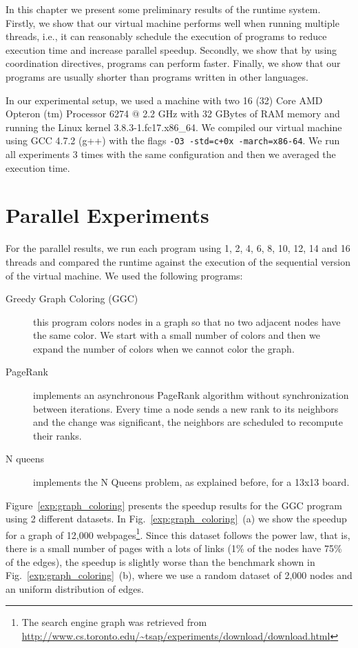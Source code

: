In this chapter we present some preliminary results of the \lang runtime system.
Firstly, we show that our virtual machine performs well when running multiple threads,
i.e., it can reasonably schedule the execution of programs to reduce execution time and increase parallel speedup. Secondly, we show that by using coordination directives, programs can perform faster.
Finally, we show that our programs are usually shorter than programs written in other languages.  

In our experimental setup, we used a machine 
with two 16 (32) Core AMD Opteron
(tm) Processor 6274 $@$ 2.2 GHz with 32 GBytes of RAM memory and running the Linux
kernel 3.8.3-1.fc17.x86\_64.
     We compiled our virtual machine using GCC 4.7.2 (g++) with the flags \texttt{-O3 -std=c+0x -march=x86-64}.
     We run all experiments 3 times with the same configuration and then we averaged the execution time.

\section{Parallel Experiments}

For the parallel results, we run each program using 1, 2, 4, 6, 8, 10, 12, 14 and 16 threads and compared the runtime against the execution of the sequential version of the virtual machine. We used the following programs:

\newcommand{\figsize}[0]{6.5cm}
\captionsetup[sub]{              %
       font=scriptsize}

\begin{description}
   \item[Greedy Graph Coloring (GGC)] this program colors nodes in a graph so that no two adjacent nodes have the same color. We start with a small number of colors and then we expand the number of colors when we cannot color the graph.
   \item[PageRank] implements an asynchronous PageRank algorithm without synchronization between iterations. Every time a node sends a new rank to its neighbors and the change was significant, the neighbors are scheduled to recompute their ranks.
   \item[N queens] implements the N Queens problem, as explained before, for a 13x13 board.
\end{description}

Figure~\ref{exp:graph_coloring} presents the speedup results for the GGC program using 2 different datasets. In Fig.~\ref{exp:graph_coloring}~(a) we show the speedup for a graph of 12,000 webpages\footnote{The search engine graph was retrieved from \url{http://www.cs.toronto.edu/~tsap/experiments/download/download.html}}. Since this dataset follows the power law, that is, there is a small number of pages with a lots of links (1\% of the nodes have 75\% of the edges), the speedup is slightly worse than the benchmark shown in Fig.~\ref{exp:graph_coloring}~(b), where we use a random dataset of 2,000 nodes and an uniform distribution of edges.

